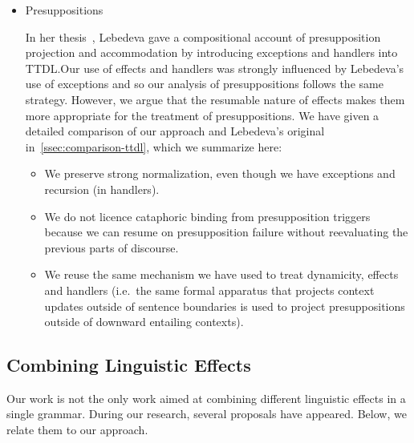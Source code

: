 \begin{itemize}
\item Presuppositions

  In her thesis~\cite{lebedeva2012expression}, Lebedeva gave a
  compositional account of presupposition projection and accommodation by
  introducing exceptions and handlers into TTDL.\@ Our use of effects and
  handlers was strongly influenced by Lebedeva's use of exceptions and so
  our analysis of presuppositions follows the same strategy. However, we
  argue that the resumable nature of effects makes them more appropriate
  for the treatment of presuppositions. We have given a detailed comparison
  of our approach and Lebedeva's original
  in~\ref{ssec:comparison-ttdl}, which we summarize here:

  \begin{itemize}
  \item We preserve strong normalization, even though we have exceptions
    and recursion (in handlers).
  \item We do not licence cataphoric binding from presupposition triggers
    because we can resume on presupposition failure without reevaluating
    the previous parts of discourse.
  \item We reuse the same mechanism we have used to treat dynamicity,
    effects and handlers (i.e.\ the same formal apparatus that projects
    context updates outside of sentence boundaries is used to project
    presuppositions outside of downward entailing contexts).
  \end{itemize}
\end{itemize}


\subsection{Combining Linguistic Effects}
\label{ssec:comparison-combining}

Our work is not the only work aimed at combining different linguistic
effects in a single grammar. During our research, several proposals have
appeared. Below, we relate them to our approach.

